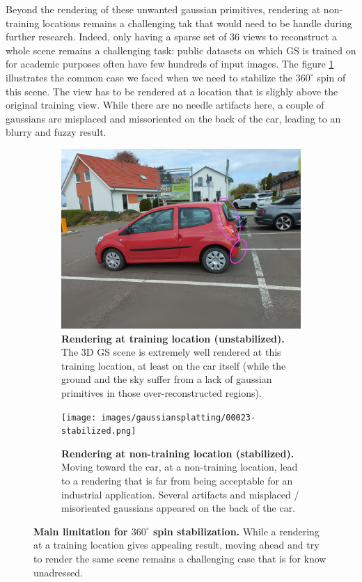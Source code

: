 Beyond the rendering of these unwanted gaussian primitives, rendering at non-training locations remains a challenging tak that would need to be handle during further research. Indeed, only having a sparse set of 36 views to reconstruct a whole scene remains a challenging task: public datasets on which \ac{GS} is trained on for academic purposes often have few hundreds of input images. The figure \ref{fig:nontraining-rendering} illustrates the common case we faced when we need to stabilize the $360^{\circ}$ spin of this scene. The view has to be rendered at a location that is slighly above the original training view. While there are no needle artifacts here, a couple of gaussians are misplaced and missoriented on the back of the car, leading to an blurry and fuzzy result. 

\begin{figure}[htb!]
  \centering
  \begin{subfigure}[b]{0.45\linewidth}
    \includegraphics[width=\linewidth]{images/gaussiansplatting/00023-unstabilized.png}
    \caption{\textbf{Rendering at training location (unstabilized).} The 3D \ac{GS} scene is extremely well rendered at this training location, at least on the car itself (while the ground and the sky suffer from a lack of gaussian primitives in those over-reconstructed regions).}
  \end{subfigure}
  \quad %
  \begin{subfigure}[b]{0.45\linewidth}
    \texttt{[image: images/gaussiansplatting/00023-stabilized.png]}
    \caption{\textbf{Rendering at non-training location (stabilized).} Moving toward the car, at a non-training location, lead to a rendering that is far from being acceptable for an industrial application. Several artifacts and misplaced / misoriented gaussians appeared on the back of the car. }
  \end{subfigure}
  \caption{\textbf{Main limitation for $360^{\circ}$ spin stabilization.} While a rendering at a training location gives appealing result, moving ahead and try to render the same scene remains a challenging case that is for know unadressed.}
  \label{fig:nontraining-rendering}
\end{figure}


